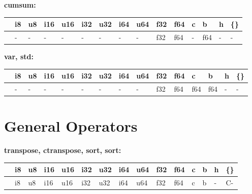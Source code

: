 \textbf{cumsum:}
\begin{scriptsize}\begin{tt}\begin{center}\vspace{-.3cm}\begin{tabular}{|m{.65cm}||m{.65cm}|m{.65cm}|m{.65cm}|m{.65cm}|m{.65cm}|m{.65cm}|m{.65cm}|m{.65cm}|m{.65cm}|m{.65cm}|m{.65cm}|m{.65cm}|m{.65cm}|m{.65cm}|}\hline 
&i8&u8&i16&u16&i32&u32&i64&u64&f32&f64&c&b&h&\{\}\\ \hline \hline
&-&-&-&-&-&-&-&-&f32&f64&-&f64&-&-\\ \hline
\end{tabular}\end{center}\end{tt}\end{scriptsize} 

\textbf{var, std:}
\begin{scriptsize}\begin{tt}\begin{center}\vspace{-.3cm}\begin{tabular}{|m{.65cm}||m{.65cm}|m{.65cm}|m{.65cm}|m{.65cm}|m{.65cm}|m{.65cm}|m{.65cm}|m{.65cm}|m{.65cm}|m{.65cm}|m{.65cm}|m{.65cm}|m{.65cm}|m{.65cm}|}\hline 
&i8&u8&i16&u16&i32&u32&i64&u64&f32&f64&c&b&h&\{\}\\ \hline \hline
&-&-&-&-&-&-&-&-&f32&f64&f64&f64&-&-\\ \hline
\end{tabular}\end{center}\end{tt}\end{scriptsize} 

\section{General Operators}

\textbf{transpose, ctranspose, sort, sort:}
\begin{scriptsize}\begin{tt}\begin{center}\vspace{-.3cm}\begin{tabular}{|m{.65cm}||m{.65cm}|m{.65cm}|m{.65cm}|m{.65cm}|m{.65cm}|m{.65cm}|m{.65cm}|m{.65cm}|m{.65cm}|m{.65cm}|m{.65cm}|m{.65cm}|m{.65cm}|m{.65cm}|}\hline 
&i8&u8&i16&u16&i32&u32&i64&u64&f32&f64&c&b&h&\{\}\\ \hline \hline
&i8&u8&i16&u16&i32&u32&i64&u64&f32&f64&c&b&-&C-\\ \hline
\end{tabular}\end{center}\end{tt}\end{scriptsize} 

